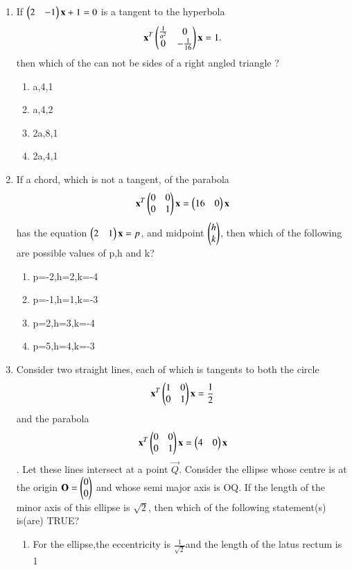 \documentclass[journal,12pt,twocolumn]{IEEEtran}
\begin{document}
\begin{enumerate}[label=\arabic*]
    \item If $\begin{pmatrix}2&-1\end{pmatrix}\mathbf{x}+1=0$ is a tangent to the hyperbola 
    \begin{align}
    \mathbf{x}^T\begin{pmatrix}\frac{1}{a^2}&0\\0&-\frac{1}{16}\end{pmatrix}\mathbf{x}=1.
    \end{align} then which of the can not be sides of a right angled triangle ?
    \begin{enumerate}
    \item a,4,1
    \item a,4,2
    \item 2a,8,1
    \item 2a,4,1
    \end{enumerate}
    \item If a chord, which is not a tangent, of the parabola
    \begin{align}
    \mathbf{x}^T\begin{pmatrix}0&0\\0&1\end{pmatrix}\mathbf{x}=\begin{pmatrix}16&0\end{pmatrix}\mathbf{x}
    \end{align} has the equation $\begin{pmatrix}2&1\end{pmatrix}\mathbf{x}=p$, and midpoint $\begin{pmatrix}h\\k\end{pmatrix}$, then which of the following are possible values of p,h and k?
    \begin{enumerate}
    \item p=-2,h=2,k=-4
    \item p=-1,h=1,k=-3
    \item p=2,h=3,k=-4
    \item p=5,h=4,k=-3
    \end{enumerate}
    \item Consider two straight lines, each of which is tangents to both the circle
    \begin{align}
    \mathbf{x}^T\begin{pmatrix}1&0\\0&1\end{pmatrix}\mathbf{x}=\frac{1}{2}
    \end{align} and the parabola 
    \begin{align} 
    \mathbf{x}^T\begin{pmatrix}0&0\\0&1\end{pmatrix}\mathbf{x}=\begin{pmatrix}4&0\end{pmatrix}\mathbf{x}
    \end{align}. Let these lines intersect at a point $\vec{Q}$. Consider the ellipse whose centre is 	at the origin $\mathbf{O}=\begin{pmatrix}0\\0\end{pmatrix}$ and whose semi major axis is OQ. If the length of the minor 		axis of this ellipse is $\sqrt{2}$, then which of the following statement(s) is(are) TRUE?
    \begin{enumerate}
    \item For the ellipse,the eccentricity is $\frac{1}{\sqrt{2}}$and the length of the latus rectum 		is 1

\end{enumerate}
\end{enumerate}
\end{document}

